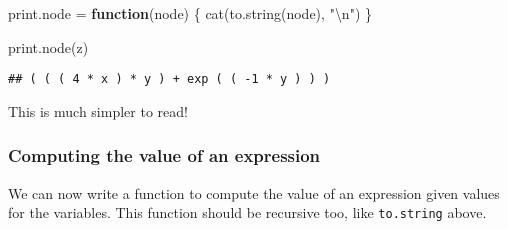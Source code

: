 \documentclass[
  a4paper,
]{article}
\newenvironment{Shaded}{\begin{snugshade}}{\end{snugshade}}
\newcommand{\ControlFlowTok}[1]{\textcolor[rgb]{0.13,0.29,0.53}{\textbf{#1}}}
\newcommand{\FunctionTok}[1]{\textcolor[rgb]{0.00,0.00,0.00}{#1}}
\newcommand{\NormalTok}[1]{#1}
\newcommand{\OtherTok}[1]{\textcolor[rgb]{0.56,0.35,0.01}{#1}}
\newcommand{\SpecialCharTok}[1]{\textcolor[rgb]{0.00,0.00,0.00}{#1}}
\newcommand{\StringTok}[1]{\textcolor[rgb]{0.31,0.60,0.02}{#1}}
\begin{document}
\begin{Shaded}
\begin{Highlighting}[]
\NormalTok{print.node }\OtherTok{=} \ControlFlowTok{function}\NormalTok{(node) \{}
  \FunctionTok{cat}\NormalTok{(}\FunctionTok{to.string}\NormalTok{(node), }\StringTok{"}\SpecialCharTok{\textbackslash{}n}\StringTok{"}\NormalTok{)}
\NormalTok{\}}

\FunctionTok{print.node}\NormalTok{(z)}
\end{Highlighting}
\end{Shaded}

\begin{verbatim}
## ( ( ( 4 * x ) * y ) + exp ( ( -1 * y ) ) )
\end{verbatim}

This is much simpler to read!

\hypertarget{computing-the-value-of-an-expression}{%
\subsubsection{Computing the value of an
expression}\label{computing-the-value-of-an-expression}}

We can now write a function to compute the value of an expression given
values for the variables. This function should be recursive too, like
\texttt{to.string} above.
\end{document}
